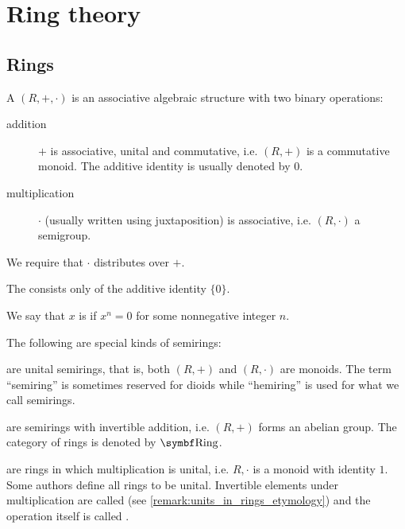 \section{Ring theory}\label{sec:ring_theory}
\subsection{Rings}\label{subsec:rings}

\begin{definition}\label{def:semiring}
  A  \( (R, +, \cdot) \) is an associative algebraic structure with two binary operations:
  \begin{description}
    \item[addition] \( + \) is associative, unital and commutative, i.e. \( (R, +) \) is a commutative monoid. The additive identity is usually denoted by \( 0 \).

    \item[multiplication] \( \cdot \) (usually written using juxtaposition) is associative, i.e. \( (R, \cdot) \) a semigroup.
  \end{description}

  We require that \( \cdot \) distributes over \( + \).

  The  consists only of the additive identity \( \{ 0 \} \).

  We say that \( x \) is  if \( x^n = 0 \) for some nonnegative integer \( n \).

  The following are special kinds of semirings:
  \begin{defenum}
      are unital semirings, that is, both \( (R, +) \) and \( (R, \cdot) \) are monoids. The term \enquote{semiring} is sometimes reserved for dioids while \enquote{hemiring} is used for what we call semirings.

      are semirings with invertible addition, i.e. \( (R, +) \) forms an abelian group. The category of rings is denoted by \( \Cat{Ring} \).

      are rings in which multiplication is unital, i.e. \( R, \cdot \) is a monoid with identity \( 1 \). Some authors define all rings to be unital. Invertible elements under multiplication are called  (see \cref{remark:units_in_rings_etymology}) and the operation itself is called .


\end{defenum}
\end{definition}
